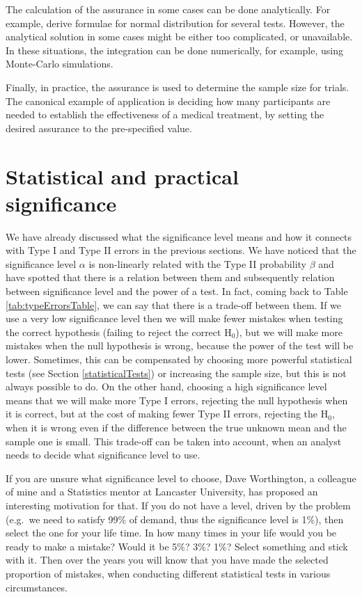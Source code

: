 \documentclass[
]{book}
\theoremstyle{definition}
\theoremstyle{definition}
\theoremstyle{definition}
\theoremstyle{definition}
\theoremstyle{remark}
\begin{document}
The calculation of the assurance in some cases can be done analytically. For example, \citet{OHagan2005} derive formulae for normal distribution for several tests. However, the analytical solution in some cases might be either too complicated, or unavailable. In these situations, the integration can be done numerically, for example, using Monte-Carlo simulations.

Finally, in practice, the assurance is used to determine the sample size for trials. The canonical example of application is deciding how many participants are needed to establish the effectiveness of a medical treatment, by setting the desired assurance to the pre-specified value.

\hypertarget{significance}{%
\section{Statistical and practical significance}\label{significance}}

We have already discussed what the significance level means and how it connects with Type I and Type II errors in the previous sections. We have noticed that the significance level \(\alpha\) is non-linearly related with the Type II probability \(\beta\) and have spotted that there is a relation between them and subsequently relation between significance level and the power of a test. In fact, coming back to Table \ref{tab:typeErrorsTable}, we can say that there is a trade-off between them. If we use a very low significance level then we will make fewer mistakes when testing the correct hypothesis (failing to reject the correct H\(_0\)), but we will make more mistakes when the null hypothesis is wrong, because the power of the test will be lower. Sometimes, this can be compensated by choosing more powerful statistical tests (see Section \ref{statisticalTests}) or increasing the sample size, but this is not always possible to do. On the other hand, choosing a high significance level means that we will make more Type I errors, rejecting the null hypothesis when it is correct, but at the cost of making fewer Type II errors, rejecting the H\(_0\), when it is wrong even if the difference between the true unknown mean and the sample one is small. This trade-off can be taken into account, when an analyst needs to decide what significance level to use.

If you are unsure what significance level to choose, Dave Worthington, a colleague of mine and a Statistics mentor at Lancaster University, has proposed an interesting motivation for that. If you do not have a level, driven by the problem (e.g.~we need to satisfy 99\% of demand, thus the significance level is 1\%), then select the one for your life time. In how many times in your life would you be ready to make a mistake? Would it be 5\%? 3\%? 1\%? Select something and stick with it. Then over the years you will know that you have made the selected proportion of mistakes, when conducting different statistical tests in various circumstances.
\end{document}
